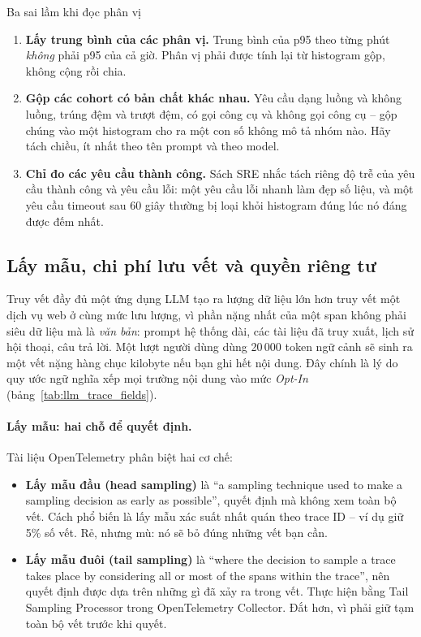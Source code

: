 \begin{pitfall}{Ba sai lầm khi đọc phân vị}
\begin{enumerate}
	\item \textbf{Lấy trung bình của các phân vị.} Trung bình của p95 theo từng phút \emph{không} phải p95 của cả giờ. Phân vị phải được tính lại từ histogram gộp, không cộng rồi chia.
	\item \textbf{Gộp các cohort có bản chất khác nhau.} Yêu cầu dạng luồng và không luồng, trúng đệm và trượt đệm, có gọi công cụ và không gọi công cụ -- gộp chúng vào một histogram cho ra một con số không mô tả nhóm nào. Hãy tách chiều, ít nhất theo tên prompt và theo model.
	\item \textbf{Chỉ đo các yêu cầu thành công.} Sách SRE nhắc tách riêng độ trễ của yêu cầu thành công và yêu cầu lỗi: một yêu cầu lỗi nhanh làm đẹp số liệu, và một yêu cầu timeout sau 60 giây thường bị loại khỏi histogram đúng lúc nó đáng được đếm nhất.
\end{enumerate}
\end{pitfall}

\subsection{Lấy mẫu, chi phí lưu vết và quyền riêng tư}
\label{ssec:trace_sampling_privacy}

Truy vết đầy đủ một ứng dụng LLM tạo ra lượng dữ liệu lớn hơn truy vết một dịch vụ web ở cùng mức lưu lượng, vì phần nặng nhất của một span không phải siêu dữ liệu mà là \emph{văn bản}: prompt hệ thống dài, các tài liệu đã truy xuất, lịch sử hội thoại, câu trả lời. Một lượt người dùng dùng 20\,000 token ngữ cảnh sẽ sinh ra một vết nặng hàng chục kilobyte nếu bạn ghi hết nội dung. Đây chính là lý do quy ước ngữ nghĩa xếp mọi trường nội dung vào mức \emph{Opt-In} (bảng~\ref{tab:llm_trace_fields}).

\paragraph{Lấy mẫu: hai chỗ để quyết định.} Tài liệu OpenTelemetry phân biệt hai cơ chế:

\begin{itemize}
	\item \textbf{Lấy mẫu đầu (head sampling)} là ``a sampling technique used to make a sampling decision as early as possible'', quyết định mà không xem toàn bộ vết. Cách phổ biến là lấy mẫu xác suất nhất quán theo trace ID -- ví dụ giữ 5\% số vết. Rẻ, nhưng mù: nó sẽ bỏ đúng những vết bạn cần.
	\item \textbf{Lấy mẫu đuôi (tail sampling)} là ``where the decision to sample a trace takes place by considering all or most of the spans within the trace'', nên quyết định được dựa trên những gì đã xảy ra trong vết. Thực hiện bằng Tail Sampling Processor trong OpenTelemetry Collector. Đắt hơn, vì phải giữ tạm toàn bộ vết trước khi quyết.
\end{itemize}

